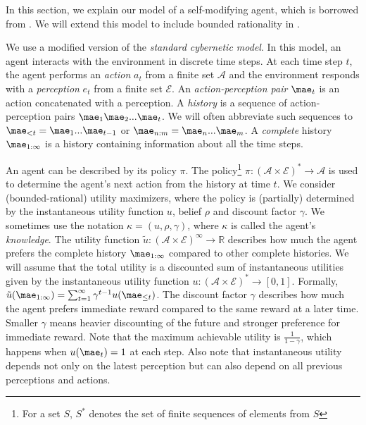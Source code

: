 	In this section, we explain our model of a self-modifying agent, which is borrowed from \citet{everitt}. We will extend this model to include bounded rationality in .

	We use a modified version of the \textit{standard cybernetic model}. In this model, an agent interacts with the environment in discrete time steps. At each time step $t$, the agent performs an \textit{action} $a_t$ from a finite set $\mathcal{A}$ and the environment responds with a \textit{perception} $e_t$ from a finite set $\mathcal{E}$. An \textit{action-perception pair} $\mae_t$ is an action concatenated with a perception. A \textit{history} is a sequence of action-perception pairs $\mae_1\mae_2...\mae_t$. We will often abbreviate such sequences to $\mae_{< t}=\mae_1...\mae_{t-1}$ or $\mae_{n:m}=\mae_n...\mae_m$. A \textit{complete} history $\mae_{1:\infty}$ is a history containing information about all the time steps.
%	
%	

    An agent can be described by its policy $\pi$. The policy\footnote{For a set $S$, $S^*$ denotes the set of finite sequences of elements from $S$} $\pi \colon (\mathcal{A \times E})^* \to \mathcal{A}$ is used to determine the agent's next action from the history at time $t$. We consider (bounded-rational) utility maximizers, where the policy is (partially) determined by the instantaneous utility function $u$, belief $\rho$ and discount factor $\gamma$. We sometimes use the notation $\kappa = (u, \rho, \gamma)$, where $\kappa$ is called the agent's \emph{knowledge}. The utility function $\tilde{u} \colon (\mathcal{A \times E})^\infty \to \mathbb{R}$ describes how much the agent prefers the complete history $\mae_{1:\infty}$ compared to other complete histories. We will assume that the total utility is a discounted sum of instantaneous utilities given by the instantaneous utility function $u \colon (\mathcal{A \times E})^* \to [0,1]$. Formally, $ \tilde{u}(\mae_{1:\infty}) = \sum ^{\infty }_{t=1}\gamma^{t-1} u(\mae_{\leq t})$. The discount factor $\gamma$ describes how much the agent prefers immediate reward compared to the same reward at a later time. Smaller $\gamma$ means heavier discounting of the future and stronger preference for immediate reward. Note that the maximum achievable utility is $\frac{1}{1-\gamma}$, which happens when $u(\mae_t)=1$ at each step. Also note that instantaneous utility depends not only on the latest perception but can also depend on all previous perceptions and actions.
	
